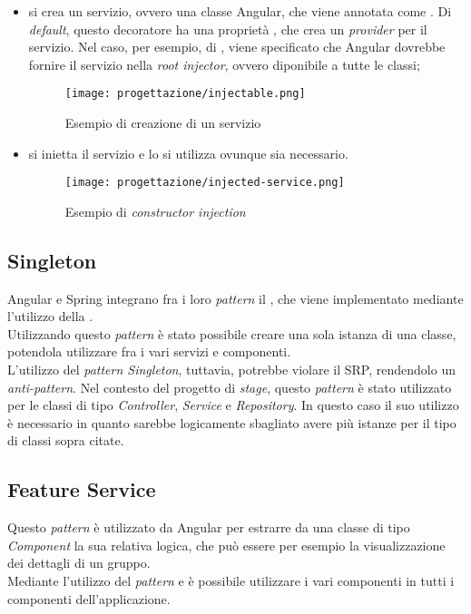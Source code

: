 \begin{itemize}
    \item si crea un servizio, ovvero una classe Angular, che viene annotata come . Di \textit{default}, questo decoratore ha una proprietà , che crea un \textit{provider} per il servizio. Nel caso, per esempio, di , viene specificato  che Angular dovrebbe fornire il servizio nella \textit{root injector}, ovvero diponibile a tutte le classi;
    \begin{figure}[H] 
        \centering 
        \texttt{[image: progettazione/injectable.png]}
        \caption{Esempio di creazione di un servizio}
    \end{figure}
    \item  si inietta il servizio e lo si utilizza ovunque sia necessario.
    \begin{figure}[H] 
        \centering 
        \texttt{[image: progettazione/injected-service.png]}
        \caption{Esempio di \textit{constructor injection}}
    \end{figure}
\end{itemize}
\subsection{Singleton}
\label{sub:Singleton}
Angular e Spring integrano fra i loro \textit{pattern} il , che viene implementato mediante l'utilizzo della .\\
Utilizzando questo \textit{pattern} è stato possibile creare una sola istanza di una classe, potendola utilizzare fra i vari servizi e componenti.\\
L'utilizzo del \textit{pattern Singleton}, tuttavia, potrebbe violare il \gls{SRP}, rendendolo un \textit{anti-pattern}. Nel contesto del progetto di \textit{stage}, questo \textit{pattern} è stato utilizzato per le classi di tipo \textit{Controller}, \textit{Service} e \textit{Repository}. In questo caso il suo utilizzo è necessario in quanto sarebbe logicamente sbagliato avere più istanze per il tipo di classi sopra citate.

\subsection{Feature Service}
Questo \textit{pattern} è utilizzato da Angular per estrarre da una classe di tipo \textit{Component} la sua relativa logica, che può essere per esempio la visualizzazione dei dettagli di un gruppo.\\
 Mediante l'utilizzo del \textit{pattern}  e  è possibile utilizzare i vari componenti in tutti i componenti dell'applicazione.
